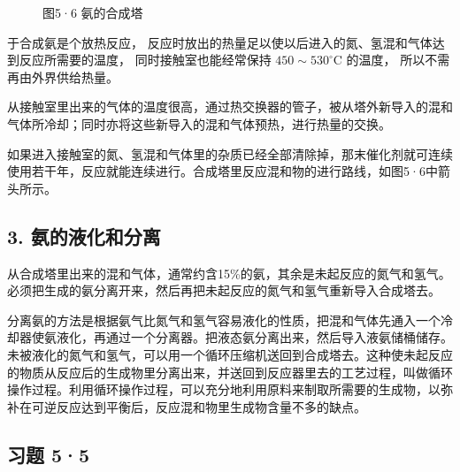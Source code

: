 \begin{figure}
\centering
\caption{图5·6 氨的合成塔}
\end{figure}

于合成氨是个放热反应，
反应时放出的热量足以使以后进入的氮、氢混和气体达到反应所需要的温度，
同时接触室也能经常保持 \(450 \sim 530^{\circ} \mathrm{C}\) 的温度，
所以不需再由外界供给热量。

从接触室里出来的气体的温度很高，通过热交换器的管子，被从塔外新导入的混和气体所冷却；同时亦将这些新导入的混和气体预热，进行热量的交换。

如果进入接触室的氮、氢混和气体里的杂质已经全部清除掉，那末催化剂就可连续使用若干年，反应就能连续进行。合成塔里反应混和物的进行路线，如图5·6中箭头所示。

\subsection{3. 氨的液化和分离}

从合成塔里出来的混和气体，通常约含15\%的氨，其余是未起反应的氮气和氢气。
必须把生成的氨分离开来，然后再把未起反应的氮气和氢气重新导入合成塔去。

分离氨的方法是根据氨气比氮气和氢气容易液化的性质，把混和气体先通入一个冷却器使氨液化，再通过一个分离器。把液态氨分离出来，然后导入液氨储桶储存。未被液化的氮气和氢气，可以用一个循环压缩机送回到合成塔去。这种使未起反应的物质从反应后的生成物里分离出来，并送回到反应器里去的工艺过程，叫做循环操作过程。利用循环操作过程，可以充分地利用原料来制取所需要的生成物，以弥补在可逆反应达到平衡后，反应混和物里生成物含量不多的缺点。

\subsection{习题 5·5}

